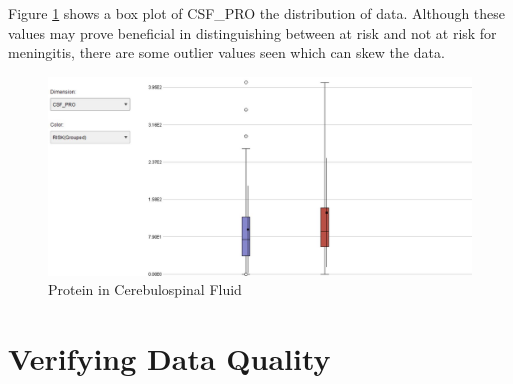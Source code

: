 \newpage
Figure \ref{box}  shows a box plot of CSF\_PRO the distribution of data. Although these values may prove beneficial in distinguishing between at risk and not at risk for meningitis, there are some outlier values seen which can skew the data.  

\begin{figure}[ht]
	\begin{center}
		\advance\leftskip-3cm
		\advance\rightskip-3cm
		\includegraphics[keepaspectratio=true,scale=0.6]{__resources/boxplot.jpg}
		\caption{Protein in Cerebulospinal Fluid}
		\label{box}
	\end{center}
\end{figure}



\newpage

\section*{Verifying Data Quality}

